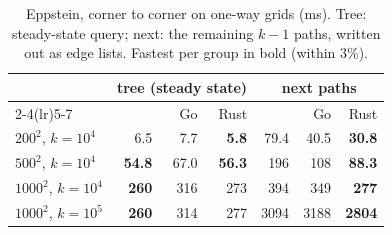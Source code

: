 \begin{table}[t]
\centering
\caption{Eppstein, corner to corner on one-way grids (ms). Tree: steady-state query; next: the remaining $k-1$ paths, written out as edge lists. Fastest per group in bold (within 3\%).}
\label{tab:eppstein}
\small
\begin{tabular}{lrrrrrr}
\toprule
 & \multicolumn{3}{c}{tree (steady state)} & \multicolumn{3}{c}{next paths} \\ \cmidrule(lr){2-4}\cmidrule(lr){5-7}
 & \cs{} & Go & Rust & \cs{} & Go & Rust \\
\midrule
$200^2$, $k=10^4$ & 6.5 & 7.7 & \textbf{5.8} & 79.4 & 40.5 & \textbf{30.8} \\
$500^2$, $k=10^4$ & \textbf{54.8} & 67.0 & \textbf{56.3} & \num{196} & \num{108} & \textbf{88.3} \\
$1000^2$, $k=10^4$ & \textbf{\num{260}} & \num{316} & \num{273} & \num{394} & \num{349} & \textbf{\num{277}} \\
$1000^2$, $k=10^5$ & \textbf{\num{260}} & \num{314} & \num{277} & \num{3094} & \num{3188} & \textbf{\num{2804}} \\
\bottomrule
\end{tabular}
\end{table}
